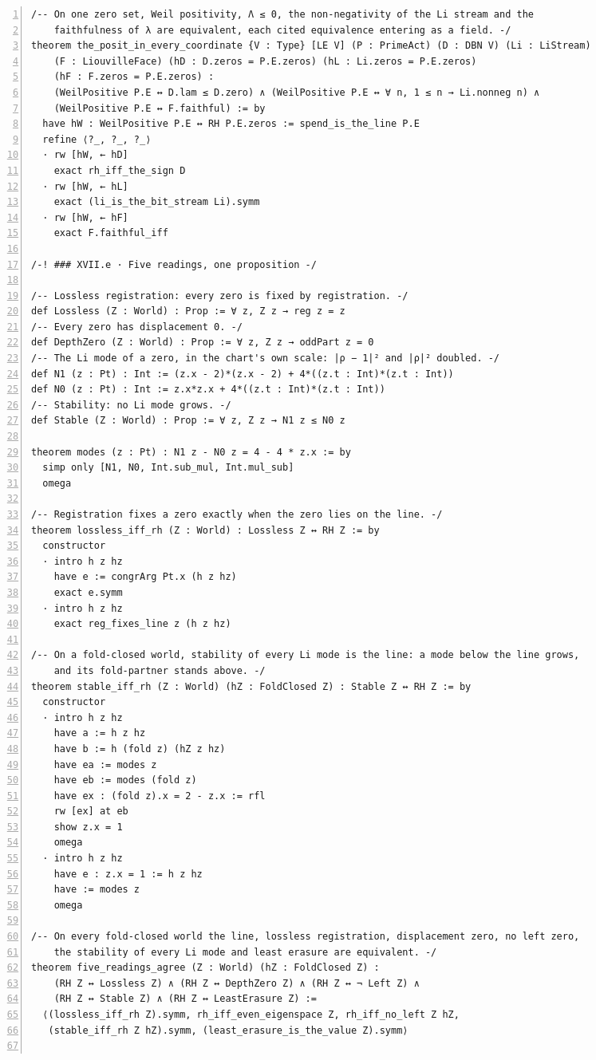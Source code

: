 \documentclass[10pt]{article}
\newcommand{\leansize}{\fontsize{5.5pt}{6.75pt}\selectfont}
\begin{document}
\begin{multicols}{2}
\begin{Verbatim}[numbers=left,firstnumber=1,numbersep=3pt,xleftmargin=2.6em,breaklines=true,breakanywhere=true,breakautoindent=false,breakindent=1.4em,breaksymbolleft={},breakanywheresymbolpre={},fontsize=\leansize]
/-- On one zero set, Weil positivity, Λ ≤ 0, the non-negativity of the Li stream and the
    faithfulness of λ are equivalent, each cited equivalence entering as a field. -/
theorem the_posit_in_every_coordinate {V : Type} [LE V] (P : PrimeAct) (D : DBN V) (Li : LiStream)
    (F : LiouvilleFace) (hD : D.zeros = P.E.zeros) (hL : Li.zeros = P.E.zeros)
    (hF : F.zeros = P.E.zeros) :
    (WeilPositive P.E ↔ D.lam ≤ D.zero) ∧ (WeilPositive P.E ↔ ∀ n, 1 ≤ n → Li.nonneg n) ∧
    (WeilPositive P.E ↔ F.faithful) := by
  have hW : WeilPositive P.E ↔ RH P.E.zeros := spend_is_the_line P.E
  refine ⟨?_, ?_, ?_⟩
  · rw [hW, ← hD]
    exact rh_iff_the_sign D
  · rw [hW, ← hL]
    exact (li_is_the_bit_stream Li).symm
  · rw [hW, ← hF]
    exact F.faithful_iff

/-! ### XVII.e · Five readings, one proposition -/

/-- Lossless registration: every zero is fixed by registration. -/
def Lossless (Z : World) : Prop := ∀ z, Z z → reg z = z
/-- Every zero has displacement 0. -/
def DepthZero (Z : World) : Prop := ∀ z, Z z → oddPart z = 0
/-- The Li mode of a zero, in the chart's own scale: |ρ − 1|² and |ρ|² doubled. -/
def N1 (z : Pt) : Int := (z.x - 2)*(z.x - 2) + 4*((z.t : Int)*(z.t : Int))
def N0 (z : Pt) : Int := z.x*z.x + 4*((z.t : Int)*(z.t : Int))
/-- Stability: no Li mode grows. -/
def Stable (Z : World) : Prop := ∀ z, Z z → N1 z ≤ N0 z

theorem modes (z : Pt) : N1 z - N0 z = 4 - 4 * z.x := by
  simp only [N1, N0, Int.sub_mul, Int.mul_sub]
  omega

/-- Registration fixes a zero exactly when the zero lies on the line. -/
theorem lossless_iff_rh (Z : World) : Lossless Z ↔ RH Z := by
  constructor
  · intro h z hz
    have e := congrArg Pt.x (h z hz)
    exact e.symm
  · intro h z hz
    exact reg_fixes_line z (h z hz)

/-- On a fold-closed world, stability of every Li mode is the line: a mode below the line grows,
    and its fold-partner stands above. -/
theorem stable_iff_rh (Z : World) (hZ : FoldClosed Z) : Stable Z ↔ RH Z := by
  constructor
  · intro h z hz
    have a := h z hz
    have b := h (fold z) (hZ z hz)
    have ea := modes z
    have eb := modes (fold z)
    have ex : (fold z).x = 2 - z.x := rfl
    rw [ex] at eb
    show z.x = 1
    omega
  · intro h z hz
    have e : z.x = 1 := h z hz
    have := modes z
    omega

/-- On every fold-closed world the line, lossless registration, displacement zero, no left zero,
    the stability of every Li mode and least erasure are equivalent. -/
theorem five_readings_agree (Z : World) (hZ : FoldClosed Z) :
    (RH Z ↔ Lossless Z) ∧ (RH Z ↔ DepthZero Z) ∧ (RH Z ↔ ¬ Left Z) ∧
    (RH Z ↔ Stable Z) ∧ (RH Z ↔ LeastErasure Z) :=
  ⟨(lossless_iff_rh Z).symm, rh_iff_even_eigenspace Z, rh_iff_no_left Z hZ,
   (stable_iff_rh Z hZ).symm, (least_erasure_is_the_value Z).symm⟩


\end{Verbatim}
\end{multicols}
\end{document}
